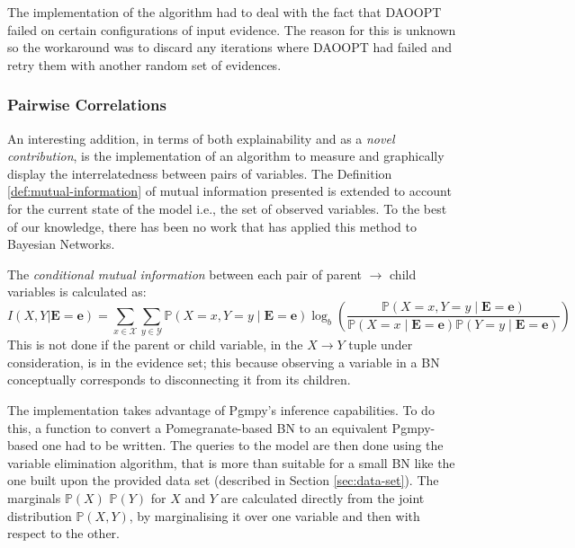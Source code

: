 The implementation of the algorithm had to deal with the fact that DAOOPT failed on certain configurations of input evidence.
The reason for this is unknown so the workaround was to discard any iterations where DAOOPT had failed and retry them with another random set of evidences.

\subsubsection{Pairwise Correlations} 
An interesting addition, in terms of both explainability and as a \textit{novel contribution}, is the implementation of an algorithm to measure and graphically display the interrelatedness between pairs of variables.
The Definition \ref{def:mutual-information} of mutual information presented is extended to account for the current state of the model i.e., the set of observed variables.
To the best of our knowledge, there has been no work that has applied this method to Bayesian Networks.

The \textit{conditional mutual information} between each pair of parent $\rightarrow$ child variables is calculated as:
\begin{equation}
	I(X,Y|\boldsymbol{E}=\boldsymbol{e}) = \sum\limits_{x \in \mathcal{X}} \sum\limits_{y \in \mathcal{Y}} \mathbb{P}(X=x,Y=y \mid \boldsymbol{E}=\boldsymbol{e}) \log_{b} \left( \frac{\mathbb{P}(X=x,Y=y \mid \boldsymbol{E}=\boldsymbol{e})}{\mathbb{P}(X=x \mid \boldsymbol{E}=\boldsymbol{e}) \mathbb{P}(Y=y \mid \boldsymbol{E}=\boldsymbol{e})} \right)
\end{equation}
This is not done if the parent or child variable, in the $X \rightarrow Y$ tuple under consideration, is in the evidence set; this because observing a variable in a BN conceptually corresponds to disconnecting it from its children.

The implementation takes advantage of Pgmpy's \citep{pgmpy} inference capabilities. 
To do this, a function to convert a Pomegranate-based BN to an equivalent Pgmpy-based one had to be written.
The queries to the model are then done using the variable elimination algorithm, that is more than suitable for a small BN like the one built upon the provided data set (described in Section \ref{sec:data-set}).
The marginals $\mathbb{P}(X)$ $\mathbb{P}(Y)$ for $X$ and $Y$ are calculated directly from the joint distribution $\mathbb{P}(X,Y)$, by marginalising it over one variable and then with respect to the other.

